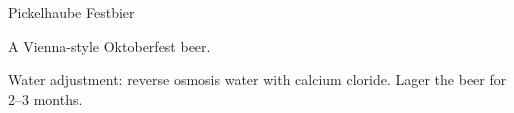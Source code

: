 \stylesection{\stylefestbier}

\begin{recipe}{Pickelhaube Festbier}

\begin{aboutblock}
A Vienna-style Oktoberfest beer. 
\end{aboutblock}


\begin{methodandtiming}
 
\begin{mashsteps}
\end{mashsteps}

\begin{fermentationsteps}
\end{fermentationsteps}

\begin{directions}
Water adjustment: reverse osmosis water with  calcium cloride.
Lager the beer for 2--3 months.
\end{directions}

\end{methodandtiming}

\recipebreak

\begin{ingredientsblock}

\begin{malts}
\end{malts}

\begin{hops}
\end{hops}


\end{ingredientsblock}

\end{recipe}
